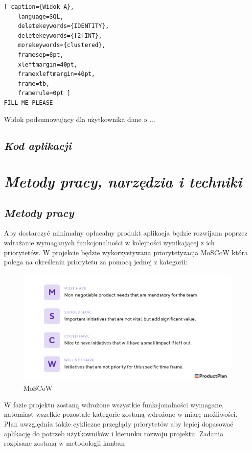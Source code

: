 \documentclass[a4paper,10pt]{report}
\newcommand{\customstylechapter}[1]{\large{\textit{#1}}}
\newcommand{\customstylesection}[1]{\textbf{\textit{#1}}}
\begin{document}


\begin{lstlisting}[ caption={Widok A},
    language=SQL,
    deletekeywords={IDENTITY},
    deletekeywords={[2]INT},
    morekeywords={clustered},
    framesep=8pt,
    xleftmargin=40pt,
    framexleftmargin=40pt,
    frame=tb,
    framerule=0pt ]
FILL ME PLEASE
\end{lstlisting}
{Widok podsumowujący dla użytkownika dane o ...}


\section{\customstylesection{Kod aplikacji}}


\chapter{\customstylechapter{Metody pracy, narzędzia i techniki}}
\section{\customstylesection{Metody pracy}}
{Aby dostarczyć minimalny opłacalny produkt \cite{MVP} aplikacja będzie 
rozwijana poprzez wdrażanie wymaganych funkcjonalności w kolejności wynikającej 
z ich priorytetów. W projekcie będzie wykorzystywana priorytetyzacja MoSCoW 
\cite{MOSCOW} która polega na określeniu priorytetu za pomocą jednej z kategorii:
\begin{figure}[H]           %
    \caption{MoSCoW}
    \label{fig:MoSCoW}
    \centering  
    \includegraphics[width=12cm]{figures/MoSCoW-01.png}
\end{figure}
W fazie projektu zostaną wdrożone wszystkie funkcjonalności wymagane, natomiast  
wszelkie pozostałe kategorie zostaną wdrożone w miarę możliwości. Plan 
uwzględnia także cykliczne przeglądy priorytetów aby lepiej dopasować aplikację 
do potrzeb użytkowników i kierunku rozwoju projektu. Zadania rozpisane zostaną 
w metodologii kanban}
\end{document}
